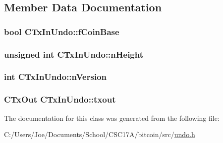 \subsection{Member Data Documentation}
\hypertarget{class_c_tx_in_undo_a5952f917224de3a2193157b856c47864}{}
\subsubsection[{f\+Coin\+Base}]{\setlength{\rightskip}{0pt plus 5cm}bool C\+Tx\+In\+Undo\+::f\+Coin\+Base}\label{class_c_tx_in_undo_a5952f917224de3a2193157b856c47864}
\hypertarget{class_c_tx_in_undo_af022118f015a9b1b9ab96e04e8452292}{}
\subsubsection[{n\+Height}]{\setlength{\rightskip}{0pt plus 5cm}unsigned int C\+Tx\+In\+Undo\+::n\+Height}\label{class_c_tx_in_undo_af022118f015a9b1b9ab96e04e8452292}
\hypertarget{class_c_tx_in_undo_a193281289475ca792e436a7a02de23ef}{}
\subsubsection[{n\+Version}]{\setlength{\rightskip}{0pt plus 5cm}int C\+Tx\+In\+Undo\+::n\+Version}\label{class_c_tx_in_undo_a193281289475ca792e436a7a02de23ef}
\hypertarget{class_c_tx_in_undo_a0eb1374984b5b68b0af14d88d7d4b821}{}
\subsubsection[{txout}]{\setlength{\rightskip}{0pt plus 5cm}C\+Tx\+Out C\+Tx\+In\+Undo\+::txout}\label{class_c_tx_in_undo_a0eb1374984b5b68b0af14d88d7d4b821}


The documentation for this class was generated from the following file\+:\begin{DoxyCompactItemize}
\item 
C\+:/\+Users/\+Joe/\+Documents/\+School/\+C\+S\+C17\+A/bitcoin/src/\hyperlink{undo_8h}{undo.\+h}\end{DoxyCompactItemize}
